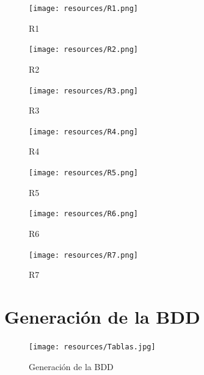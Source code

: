 \begin{figure}[h]
    \centering
    \texttt{[image: resources/R1.png]}
    \caption{R1}
\end{figure}

\begin{figure}[h]
    \centering
    \texttt{[image: resources/R2.png]}
    \caption{R2}
\end{figure}

\begin{figure}[h]
    \centering
    \texttt{[image: resources/R3.png]}
    \caption{R3}
\end{figure}

\begin{figure}[h]
    \centering
    \texttt{[image: resources/R4.png]}
    \caption{R4}
\end{figure}

\begin{figure}[h]
    \centering
    \texttt{[image: resources/R5.png]}
    \caption{R5}
\end{figure}

\begin{figure}[h]
    \centering
    \texttt{[image: resources/R6.png]}
    \caption{R6}
\end{figure}

\begin{figure}[h]
    \centering
    \texttt{[image: resources/R7.png]}
    \caption{R7}
\end{figure}

\clearpage

\section{Generación de la BDD}
\begin{figure}[h]
    \centering
    \texttt{[image: resources/Tablas.jpg]}
    \caption{Generación de la BDD}
\end{figure}
